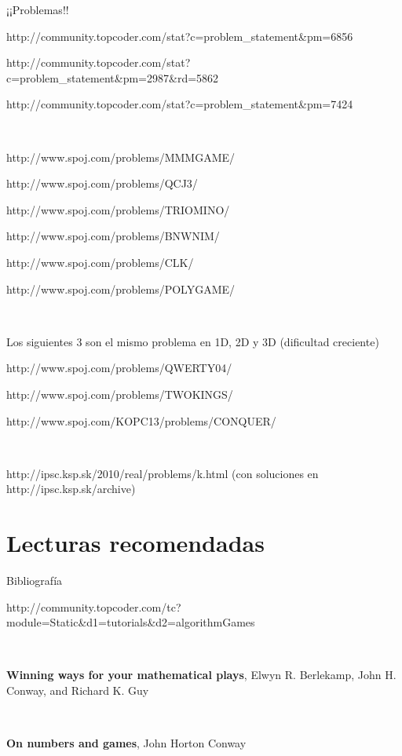 \documentclass{beamer}
\begin{document}
\begin{frame}{¡¡Problemas!!}

    {\tiny

    http://community.topcoder.com/stat?c=problem\_statement\&pm=6856
    
    http://community.topcoder.com/stat?c=problem\_statement\&pm=2987\&rd=5862
    
    http://community.topcoder.com/stat?c=problem\_statement\&pm=7424
    
    \
    
    http://www.spoj.com/problems/MMMGAME/
    
    http://www.spoj.com/problems/QCJ3/
    
    http://www.spoj.com/problems/TRIOMINO/
    
    http://www.spoj.com/problems/BNWNIM/
    
    http://www.spoj.com/problems/CLK/
    
    http://www.spoj.com/problems/POLYGAME/

    \ 

    Los siguientes 3 son el mismo problema en 1D, 2D y 3D (dificultad creciente)
    
    http://www.spoj.com/problems/QWERTY04/
    
    http://www.spoj.com/problems/TWOKINGS/
    
    http://www.spoj.com/KOPC13/problems/CONQUER/

    \ 

    http://ipsc.ksp.sk/2010/real/problems/k.html (con soluciones en http://ipsc.ksp.sk/archive)}

\end{frame}

\section{Lecturas recomendadas}

\begin{frame}{Bibliografía}

    {\tiny

    http://community.topcoder.com/tc?module=Static\&d1=tutorials\&d2=algorithmGames

    \

    \textbf{Winning ways for your mathematical plays},  Elwyn R. Berlekamp, John H. Conway, and Richard K. Guy

    \

    \textbf{On numbers and games}, John Horton Conway}

\end{frame}
\end{document}
